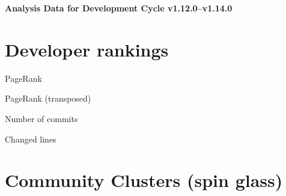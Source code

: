\documentclass{article}
\begin{document}
\setlength{\parindent}{0pt}
\begin{center}
\begin{Large}
\textbf{Analysis Data for Development Cycle v1.12.0--v1.14.0}
\end{Large}
\end{center}
\section{Developer rankings}
\begin{small}\renewcommand{\tabcolsep}{1pt}
\begin{minipage}{0.5\linewidth}
PageRank\\

\end{minipage}%
\begin{minipage}{0.5\linewidth}
PageRank (transposed)\\

\end{minipage}

\renewcommand{\tabcolsep}{5pt}
\begin{minipage}{0.5\linewidth}
Number of commits\\

\end{minipage}%
\begin{minipage}{0.5\linewidth}
Changed lines\\

\end{minipage}
\end{small}
\newpage\section{Community Clusters (spin glass)}
\end{document}
